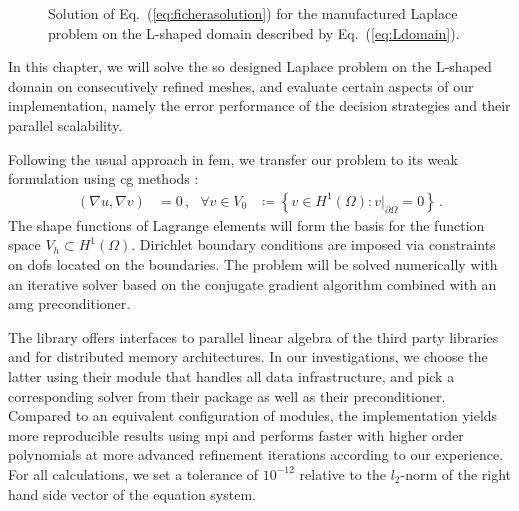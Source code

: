 \begin{figure}
\centering

\caption[Solution of the manufactured Laplace problem on the L-shaped domain.]{Solution of Eq.~(\ref{eq:ficherasolution}) for the manufactured Laplace problem on the L-shaped domain described by Eq.~(\ref{eq:Ldomain}).}
\label{fig:solution}
\end{figure}

In this chapter, we will solve the so designed Laplace problem on the L-shaped domain on consecutively refined meshes, and evaluate certain aspects of our implementation, namely the error performance of the decision strategies and their parallel scalability.

Following the usual approach in \gls{fem}, we transfer our problem to its weak formulation using \gls{cg} methods \parencite{brenner2008}:
\begin{align}
\left(\nabla u, \nabla v\right) &= 0 \,\text{,} & \forall v \in V_0 &\coloneqq \left\{ v \in H^1(\Omega): v|_{\partial\Omega} = 0 \right\} \,\text{.}
\end{align}
The shape functions of Lagrange elements will form the basis for the function space $V_h \subset H^1(\Omega)$. Dirichlet boundary conditions are imposed via constraints on \glspl{dof} located on the boundaries. The problem will be solved numerically with an iterative solver based on the conjugate gradient algorithm combined with an \gls{amg} preconditioner.

The \dealii{} library offers interfaces to parallel linear algebra of the third party libraries \petsc{} \textcite{petsc3124} and \trilinos{} \textcite{trilinos12181} for distributed memory architectures. In our investigations, we choose the latter using their \epetra{}
module that handles all data infrastructure, and pick a corresponding solver from their \aztecoo{}
package as well as their \ml{}
preconditioner. Compared to an equivalent configuration of \petsc{} modules, the \trilinos{} implementation yields more reproducible results using \gls{mpi} \parencite[FAQ]{petsc3124} and performs faster with higher order polynomials at more advanced refinement iterations according to our experience. For all calculations, we set a tolerance of $10^{-12}$ relative to the $l_2$-norm of the right hand side vector of the equation system.





